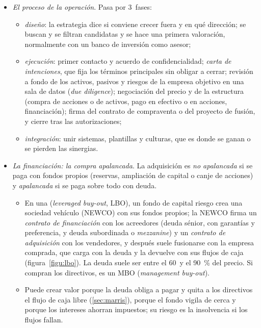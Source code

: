 \documentclass[11pt]{article}
\begin{document}
\begin{itemize}
\item \emph{El proceso de la operación}. Pasa por 3~fases\nocite{DePamphilis2014Mergers}:
  \begin{itemize}
  \item \emph{diseño}: la estrategia dice si conviene crecer fuera y en qué dirección; se buscan y se filtran candidatas y se hace una primera valoración, normalmente con un banco de inversión como asesor;
  \item \emph{ejecución}: primer contacto y acuerdo de confidencialidad; \emph{carta de intenciones}, que fija los términos principales sin obligar a cerrar; revisión a fondo de los activos, pasivos y riesgos de la empresa objetivo en una sala de datos (\emph{due diligence}); negociación del precio y de la estructura (compra de acciones o de activos, pago en efectivo o en acciones, financiación); firma del contrato de compraventa o del proyecto de fusión, y cierre tras las autorizaciones;
  \item \emph{integración}: unir sistemas, plantillas y culturas, que es donde se ganan o se pierden las sinergias.
  \end{itemize}
\item \emph{La financiación: la compra apalancada}. La adquisición es \emph{no apalancada} si se paga con fondos propios (reservas, ampliación de capital o canje de acciones) y \emph{apalancada} si se paga sobre todo con deuda.
  \begin{itemize}
  \item En una  (\emph{leveraged buy-out}, LBO), un fondo de capital riesgo crea una sociedad vehículo (NEWCO) con sus fondos propios; la NEWCO firma un \emph{contrato de financiación} con los acreedores (deuda sénior, con garantías y preferencia, y deuda subordinada o \emph{mezzanine}) y un \emph{contrato de adquisición} con los vendedores, y después suele fusionarse con la empresa comprada, que carga con la deuda y la devuelve con sus flujos de caja (figura~\ref{figu:lbo}). La deuda suele ser entre el 60~y el 90~\% del precio\nocite{KaplanStromberg2009Leveraged}. Si compran los directivos, es un MBO (\emph{management buy-out}).
  \item Puede crear valor porque la deuda obliga a pagar y quita a los directivos el flujo de caja libre (\ref{sec:marris}), porque el fondo vigila de cerca y porque los intereses ahorran impuestos\nocite{Jensen1989Eclipse,KaplanStromberg2009Leveraged}; su riesgo es la insolvencia si los flujos fallan.
  \end{itemize}
\end{itemize}
\end{document}
